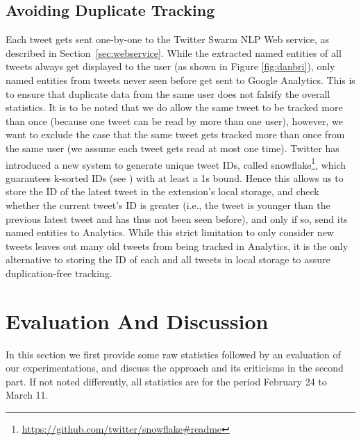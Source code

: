 \documentclass[runningheads,a4paper]{llncs}
\begin{document}
\subsection{Avoiding Duplicate Tracking}
Each tweet gets sent one-by-one to the Twitter Swarm NLP Web service, as described in Section~\ref{sec:webservice}. While the extracted named entities of all tweets always get displayed to the user (as shown in Figure \ref{fig:danbri}), only named entities from tweets never seen before get sent to Google Analytics. This is to ensure that duplicate data from the same user does not falsify the overall statistics. It is to be noted that we do allow the same tweet to be tracked more than once (because one tweet can be read by more than one user), however, we want to exclude the case that the same tweet gets tracked more than once from the same user (we assume each tweet gets read at most one time). Twitter has introduced a new system to generate unique tweet IDs, called snowflake\footnote{\url{https://github.com/twitter/snowflake#readme}}, which guarantees k-sorted IDs (see \cite{Altman:1989:RSS:70413.70419}) with at least a 1s bound. Hence this allows us to store the ID of the latest tweet in the extension's local storage, and check whether the current tweet's ID is greater (i.e., the tweet is younger than the previous latest tweet and has thus not been seen before), and only if so, send its named entities to Analytics. While this strict limitation to only consider new tweets leaves out many old tweets from being tracked in Analytics, it is the only alternative to storing the ID of each and all tweets in local storage to assure duplication-free tracking.

\section{Evaluation And Discussion}\label{sec:evaluation}
In this section we first provide some raw statistics followed by an evaluation of our experimentations, and discuss the approach and its criticisms in the second part. If not noted differently, all statistics are for the period February 24 to March 11.
\end{document}
